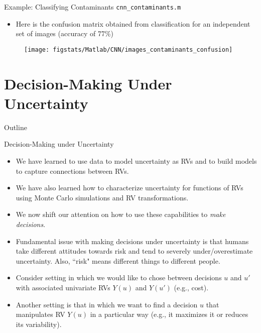 \documentclass[9pt]{beamer}
\begin{document}
\begin{frame}{Example: Classifying Contaminants \footnotesize{\texttt{cnn\_contaminants.m}}}

\begin{itemize}
\item Here is the confusion matrix obtained from classification for an independent set of images (accuracy of 77\%)
\end{itemize}

\begin{figure}[!htb]
    \centering
\texttt{[image: figstats/Matlab/CNN/images\_contaminants\_confusion]}
\end{figure}

\end{frame}

\section{Decision-Making Under Uncertainty}
\begin{frame}{Outline}
\tableofcontents[currentsection]
\end{frame}

%
\begin{frame}{Decision-Making under Uncertainty}
\begin{itemize}
   \setlength{\itemsep}{10pt}
\item We have learned to use data to model uncertainty as RVs and to build models to capture connections between RVs. 
\item We have also learned how to characterize uncertainty for functions of RVs using Monte Carlo simulations and RV transformations. 

\item We now shift our attention on how to use these capabilities to {\em make decisions}. 

\item Fundamental issue with making decisions under uncertainty is that humans take different attitudes towards risk and tend to severely under/overestimate uncertainty. Also, ``risk" means different things to different people. 

\item Consider setting in which we would like to chose between decisions $u$ and $u'$ with associated univariate RVs $Y(u)$ and $Y(u')$ (e.g., cost). 

\item Another setting is that in which we want to find a decision $u$ that manipulates RV $Y(u)$ in a particular way (e.g., it maximizes it or reduces its variability). 

\end{itemize}

\end{frame}
\end{document}
